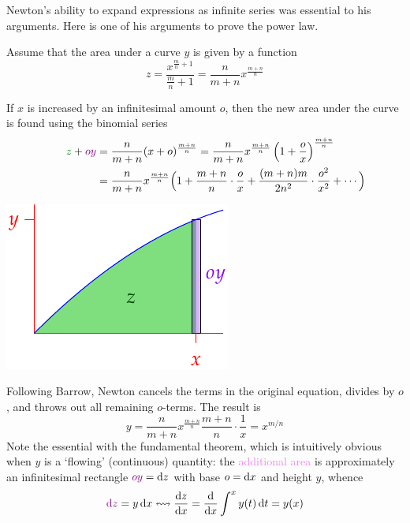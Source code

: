 Newton's ability to expand expressions as infinite series was essential to his arguments. Here is one of his arguments to prove the power law.
\begin{enumerate}
  \begin{minipage}[t]{0.68\linewidth}\vspace{-5pt}
	  \item Assume that the area under a curve $y$ is given by a function
	  \[
	  	z=\frac{x^{\frac mn+1}}{\frac mn+1}=\frac n{m+n}x^{\frac{m+n}n}
	  \]
	  \item If $x$ is increased by an infinitesimal amount $o$, then the new area under the curve is found using the binomial series
  \begin{align*}
  	\textcolor{Green}{z}+\textcolor{violet}{oy}&=\frac n{m+n}(x+o)^{\frac{m+n}n} =\frac n{m+n}x^{\frac{m+n}n}\left(1+\frac ox\right)^{\frac{m+n}n}\\
  	&=\frac n{m+n}x^{\frac{m+n}n} \Bigl(1+\frac{m+n}n\cdot\frac ox+\frac{(m+n)m}{2n^2}\cdot\frac{o^2}{x^2}+ \makebox[0pt][l]{$\cdots\Bigr)$}
  \end{align*}
	\end{minipage}
	\hfill
	\begin{minipage}[t]{0.31\linewidth}\vspace{-5pt}
		\flushright\includegraphics[scale=1]{ftcold}\vspace{-25pt}
	\end{minipage}\par
  


  \item Following Barrow, Newton cancels the terms in the original equation, divides by $o$, and throws out all remaining $o$-terms. The result is
  \[
  	y=\frac n{m+n}x^{\frac{m+n}n}\frac{m+n}n\cdot\frac 1x=x^{m/n}
  \]
  Note the essential with the fundamental theorem, which is intuitively obvious when $y$ is a `flowing' (continuous) quantity: the \textcolor{violet}{additional area} is approximately an infinitesimal rectangle $\textcolor{violet}{oy}=\dz$ with base $o=\dx$ and height $y$, whence
  \[
 		\textcolor{violet}{\dz}=y\,\dx \leftrightsquigarrow\diff[z]{x}=\diff x\int^xy(t)\,\dt=y(x)
  \]
\end{enumerate}

